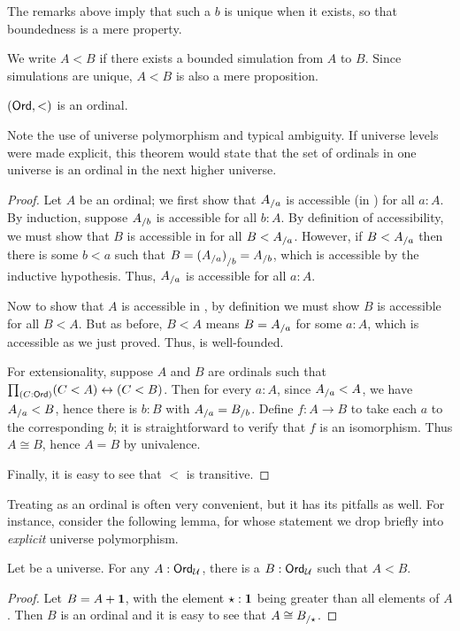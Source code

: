 The remarks above imply that such a $b$ is unique when it exists, so that boundedness is a mere property.

We write $A<B$ if there exists a bounded simulation from $A$ to $B$.
Since simulations are unique, $A<B$ is also a mere proposition.

\begin{thm}\label{thm:ordord}
  $(\mathsf{Ord},<)$ is an ordinal.
\end{thm}

\begin{rmk}
  Note the use of universe polymorphism and typical ambiguity.
  If universe levels were made explicit, this theorem would state that the set of ordinals in one universe is an ordinal in the next higher universe.
\end{rmk}

\begin{proof}
  Let $A$ be an ordinal; we first show that ${A}_{/a}$ is accessible (in \ord) for all $a:A$.
  By induction, suppose ${A}_{/b}$ is accessible for all $b:A$.
  By definition of accessibility, we must show that $B$ is accessible in \ord for all $B<{A}_{/a}$.
  However, if $B<{A}_{/a}$ then there is some $b<a$ such that $B = {({A}_{/a})}_{/b} = {A}_{/b}$, which is accessible by the inductive hypothesis.
  Thus, ${A}_{/a}$ is accessible for all $a:A$.

  Now to show that $A$ is accessible in \ord, by definition we must show $B$ is accessible for all $B<A$.
  But as before, $B<A$ means $B={A}_{/a}$ for some $a:A$, which is accessible as we just proved.
  Thus, \ord is well-founded.

  For extensionality, suppose $A$ and $B$ are ordinals such that $\prd{C:\ord} (C<A) \leftrightarrow (C<B)$.
  Then for every $a:A$, since ${A}_{/a}<A$, we have ${A}_{/a}<B$, hence there is $b:B$ with ${A}_{/a} = {B}_{/b}$.
  Define $f:A\to B$ to take each $a$ to the corresponding $b$; it is straightforward to verify that $f$ is an isomorphism.
  Thus $A\cong B$, hence $A=B$ by univalence.

  Finally, it is easy to see that $<$ is transitive.
\end{proof}

Treating \ord as an ordinal is often very convenient, but it has its pitfalls as well.
For instance, consider the following lemma, for whose statement we drop briefly into \emph{explicit} universe polymorphism.

\begin{lem}\label{thm:ordsucc}
  Let \bbU be a universe.
  For any $A:\mathsf{Ord}_\mathcal{U}$, there is a $B:\mathsf{Ord}_\mathcal{U}$ such that $A<B$.
\end{lem}
\begin{proof}
  Let $B=A+\mathbf{1}$, with the element $\star:\mathbf{1}$ being greater than all elements of $A$.
  Then $B$ is an ordinal and it is easy to see that $A\cong {B}_{/\star}$.
\end{proof}

